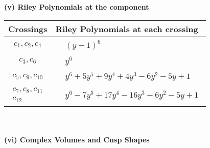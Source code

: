 \documentclass[1p]{elsarticle_modified}
\theoremstyle{definition}
\begin{document}
\newpage\renewcommand{\arraystretch}{1}
\flushleft \textbf{(v) Riley Polynomials at the component}\newline \\
\begin{tabular}{m{50pt}|m{274pt}}
Crossings & \hspace{64pt}Riley Polynomials at each crossing \\
\hline $$\begin{aligned}c_{1},c_{2},c_{4}\end{aligned}$$&$\begin{aligned}
&(y-1)^6
\end{aligned}$\\
\hline $$\begin{aligned}c_{3},c_{6}\end{aligned}$$&$\begin{aligned}
&y^6
\end{aligned}$\\
\hline $$\begin{aligned}c_{5},c_{9},c_{10}\end{aligned}$$&$\begin{aligned}
&y^6+5 y^5+9 y^4+4 y^3-6 y^2-5 y+1
\end{aligned}$\\
\hline $$\begin{aligned}c_{7},c_{8},c_{11}\\c_{12}\end{aligned}$$&$\begin{aligned}
&y^6-7 y^5+17 y^4-16 y^3+6 y^2-5 y+1
\end{aligned}$\\
\hline
\end{tabular}\\~\\
\newpage\flushleft \textbf{(vi) Complex Volumes and Cusp Shapes}
\end{document}
